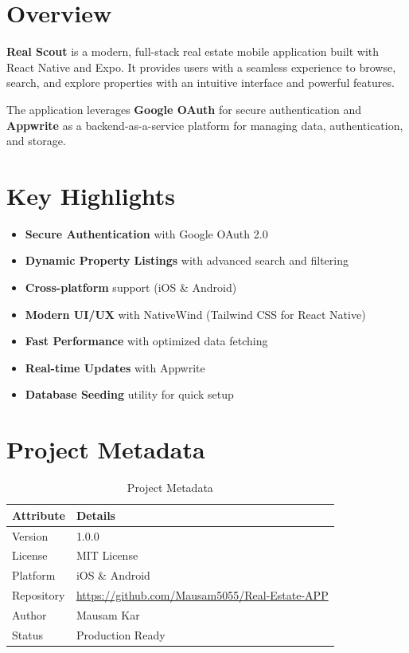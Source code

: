 \documentclass[11pt,a4paper,oneside]{book}
\begin{document}
\section{Overview}

\textbf{Real Scout} is a modern, full-stack real estate mobile application built with React Native and Expo. It provides users with a seamless experience to browse, search, and explore properties with an intuitive interface and powerful features.

\begin{keypoint}
The application leverages \textbf{Google OAuth} for secure authentication and \textbf{Appwrite} as a backend-as-a-service platform for managing data, authentication, and storage.
\end{keypoint}

\section{Key Highlights}

\begin{itemize}[leftmargin=2cm]
    \item[\faLock] \textbf{Secure Authentication} with Google OAuth 2.0
    \item[\faHome] \textbf{Dynamic Property Listings} with advanced search and filtering
    \item[\faMobile] \textbf{Cross-platform} support (iOS \& Android)
    \item[\faPalette] \textbf{Modern UI/UX} with NativeWind (Tailwind CSS for React Native)
    \item[\faBolt] \textbf{Fast Performance} with optimized data fetching
    \item[\faSync] \textbf{Real-time Updates} with Appwrite
    \item[\faSeedling] \textbf{Database Seeding} utility for quick setup
\end{itemize}

\section{Project Metadata}

\begin{table}[h]
\centering
\begin{tabularx}{\textwidth}{lX}
\toprule
\textbf{Attribute} & \textbf{Details} \\
\midrule
Version & 1.0.0 \\
License & MIT License \\
Platform & iOS \& Android \\
Repository & \url{https://github.com/Mausam5055/Real-Estate-APP} \\
Author & Mausam Kar \\
Status & Production Ready \\
\bottomrule
\end{tabularx}
\caption{Project Metadata}
\end{table}
\end{document}
